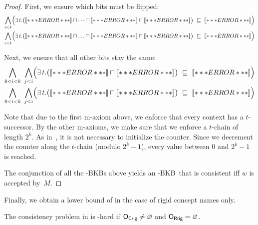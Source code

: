 \begin{proof}
  First, we ensure which bits must be flipped:
  \begin{align*}
    \bigwedge_{i<k} \Bigl( \exists t.\bigl(\oax{A_{0}'(a)} \sqcap \dots \sqcap \oax{A_{i-1}'(a)} \sqcap \oax{A_{i}'(a)}\bigr)
    & \ \sqsubseteq\ \oax{(\lnot A_{i}')(a)}\Bigr)\\ 
    \bigwedge_{i<k}\Bigl( \exists t.\bigl(\oax{A_{0}'(a)}\sqcap\ldots\sqcap \oax{A_{i-1}'(a)} \sqcap \oax{(\lnot A_{i}')(a)}\bigr)
    & \ \sqsubseteq\ \oax{A_{i}'(a)}\Bigr)
    \end{align*}

    Next, we ensure that all other bits stay the same:
    \begin{align*}
      \bigwedge_{0<i<k}\ \bigwedge_{j<i}\Bigl(\exists t.\bigl(\oax{(\lnot A_{j}')(a)}\sqcap\oax{A_{i}'(a)}\bigr)
      & \ \sqsubseteq\ \oax{A_{i}'(a)}\Bigr)\\
      \bigwedge_{0<i<k}\ \bigwedge_{j<i}\Bigl(\exists t.\bigl(\oax{(\lnot A_{j}')(a)}\sqcap\oax{(\lnot A_{i}')(a)}\bigr)
      & \ \sqsubseteq\ \oax{(\lnot A_{i}')(a)}\Bigr)
    \end{align*}

    Note that due to the first m-axiom above, we enforce that every context has a $t$-successor.  By
    the other m-axioms, we make sure that we enforce a $t$-chain of length $2^k$.
    As in~\cite{BaGL-KR08,BaGL-ToCL12}, it is not necessary to initialize the counter.  Since we
    decrement the counter along the $t$-chain (modulo $2^k-1$), every value between $0$ and $2^k-1$
    is reached.

    The conjunction of all the \ELALC-BKBs above yields an \ELALC-BKB~\B that is consistent iff $w$
    is accepted by~$M$.
  \end{proof}

Finally, we obtain a lower bound of \NExpTime in the case of rigid concept names
only.

\begin{theorem}\label{thm:el-lower-nexp}
  The consistency problem in \ELALC is \NExpTime-hard if $\mathsf{O_{Crig}} \neq \varnothing$ and
  $\mathsf{O_{Rrig}} = \varnothing$.
\end{theorem}

